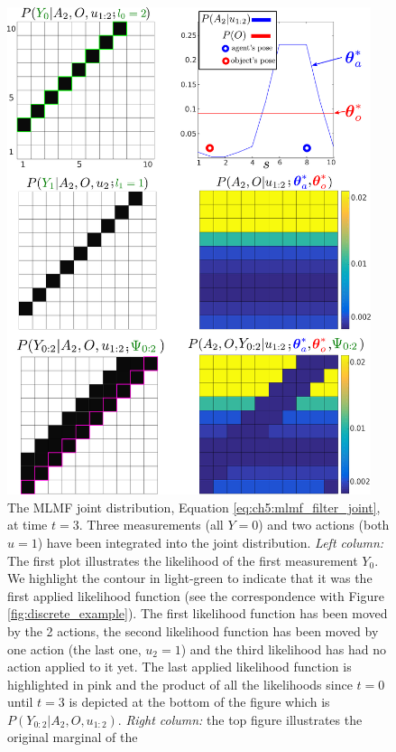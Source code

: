 \begin{figure}
 \centering
 \includegraphics[width=0.95\textwidth]{./ch5-MLMF/Figures/explenation/example_marginal.pdf}
 \caption{The MLMF joint distribution, Equation \ref{eq:ch5:mlmf_filter_joint}, at time $t=3$.
 Three measurements (all $Y=0$) and two actions (both $u=1$) have been integrated into the joint distribution. \textit{Left column:} The first plot
 illustrates the likelihood of the first measurement $Y_0$. We highlight the contour in light-green to indicate that it was the first applied likelihood 
 function (see the correspondence with Figure \ref{fig:discrete_example}). The first likelihood function has been moved by the 2 actions, the 
 second likelihood function has been moved by one action (the last one, $u_2=1$) and the third likelihood has had no action applied to it 
 yet. The last applied likelihood function is highlighted in pink and the product of all the likelihoods since $t=0$ until $t=3$ is depicted at the 
 bottom of the figure which is $P(Y_{0:2}|A_2,O,u_{1:2})$. \textit{Right column:} the top figure illustrates the original marginal of the 
}
\end{figure}

